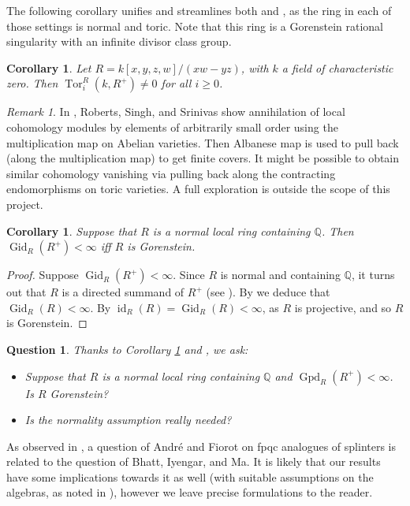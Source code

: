 \documentclass[12pt,reqno]{amsart}
\newtheorem{corollary}[theorem]{Corollary}
\newtheorem{question}[theorem]{Question}
\theoremstyle{definition}
\theoremstyle{remark}
\newtheorem{remark}[theorem]{Remark}
\theoremstyle{cited}
\theoremstyle{remark}
\theoremstyle{citeddef}
\DeclareMathOperator{\Tor}{Tor}
\begin{document}
	
	The following corollary unifies and streamlines both \cite[Proposition 5.6]{Elham} and \cite[2.1]{RSS}, as the ring in each of those settings is normal and toric. Note that this ring is a Gorenstein rational singularity with an infinite divisor class group. 
	
	\begin{corollary}\label{quad}
		Let \( R = k[x,y,z,w]/(xw - yz) \), with \( k \) a field of characteristic zero. Then \( \Tor_i^R(k, R^+) \neq 0 \) for all \( i \geq 0 \).
	\end{corollary}
	
	\begin{remark}
		In \cite{RSS}, Roberts, Singh, and Srinivas show annihilation of local cohomology modules by elements of arbitrarily small order using the multiplication map on Abelian varieties. Then Albanese map is used to pull back (along the multiplication map) to get finite covers. It might be possible to obtain similar cohomology vanishing via pulling back along the contracting endomorphisms on toric varieties. A full exploration is outside the scope of this project.
	\end{remark}
	\begin{corollary}\label{c3.2}
		Suppose that $R$ is a normal local ring containing $\mathbb{Q}$. Then   $\operatorname{Gid}_R(R^+)<\infty$ iff $R$ is Gorenstein.
	\end{corollary}
	
	\begin{proof} 
		Suppose $\operatorname{Gid}_R(R^+)<\infty$. Since $R$ is normal and 
		containing $\mathbb{Q}$, it turns out that $R$ is a directed summand of 
		$R^+$ (see \cite[Lemma 2.1]{Shravan}). By \cite[Proposition 3.3]{Totally} we deduce that
		$\operatorname{Gid}_R(R)<\infty$. By \cite[Proposition 3.3]{Totally}
		$\operatorname{id}_R(R)=\operatorname{Gid}_R(R)<\infty$, as $R$ is projective, and so $R$ is Gorenstein.
	\end{proof}
	\begin{question} Thanks to  Corollary \ref{c3.2} and \cite[Question 6.7]{Asg26}, we ask:
		\begin{itemize}
			\item[(a)] Suppose that $R$ is a normal local ring containing $\mathbb{Q}$ and  $\operatorname{Gpd}_R(R^+)<\infty$. Is $R$  Gorenstein?
			
			\item[(b)] Is the normality assumption really needed?\end{itemize}
	\end{question}
	As observed in \cite{Shravan}, a question of Andr\'e and Fiorot \cite{AF} on fpqc analogues of splinters is related to the question of Bhatt, Iyengar, and Ma. It is likely that our results have some implications towards it as well (with suitable assumptions on the algebras, as noted in \cite{Shravan}), however we leave precise formulations to the reader.
	
\end{document}
